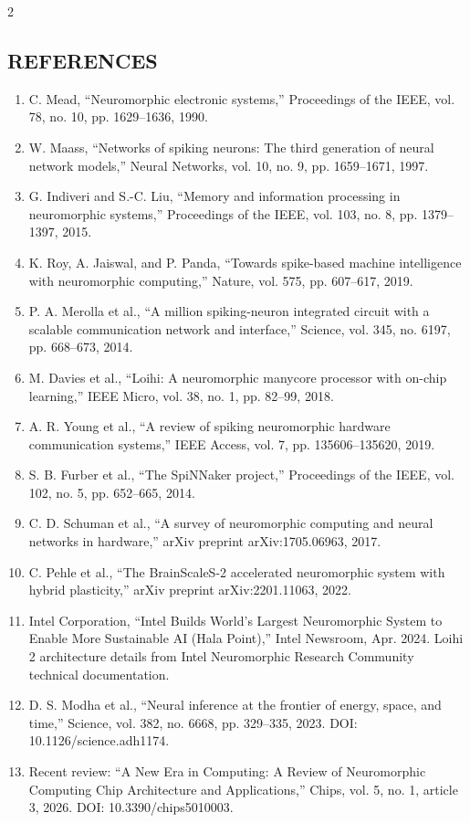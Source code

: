 \begin{multicols}{2}
  \subsection*{\centering\uppercase{References}}

  \begingroup
  \footnotesize
  \setlength{\itemsep}{0pt}
  \begin{enumerate}
    \item C. Mead, “Neuromorphic electronic systems,” Proceedings of the IEEE, vol. 78, no. 10, pp. 1629–1636, 1990.
    \item W. Maass, “Networks of spiking neurons: The third generation of neural network models,” Neural Networks, vol. 10, no. 9, pp. 1659–1671, 1997.
    \item G. Indiveri and S.-C. Liu, “Memory and information processing in neuromorphic systems,” Proceedings of the IEEE, vol. 103, no. 8, pp. 1379–1397, 2015.
    \item K. Roy, A. Jaiswal, and P. Panda, “Towards spike-based machine intelligence with neuromorphic computing,” Nature, vol. 575, pp. 607–617, 2019.
    \item P. A. Merolla et al., “A million spiking-neuron integrated circuit with a scalable communication network and interface,” Science, vol. 345, no. 6197, pp. 668–673, 2014.
    \item M. Davies et al., “Loihi: A neuromorphic manycore processor with on-chip learning,” IEEE Micro, vol. 38, no. 1, pp. 82–99, 2018.
    \item A. R. Young et al., “A review of spiking neuromorphic hardware communication systems,” IEEE Access, vol. 7, pp. 135606–135620, 2019.
    \item S. B. Furber et al., “The SpiNNaker project,” Proceedings of the IEEE, vol. 102, no. 5, pp. 652–665, 2014.
    \item C. D. Schuman et al., “A survey of neuromorphic computing and neural networks in hardware,” arXiv preprint arXiv:1705.06963, 2017.
    \item C. Pehle et al., “The BrainScaleS-2 accelerated neuromorphic system with hybrid plasticity,” arXiv preprint arXiv:2201.11063, 2022.
    \item Intel Corporation, “Intel Builds World’s Largest Neuromorphic System to Enable More Sustainable AI (Hala Point),” Intel Newsroom, Apr. 2024. Loihi 2 architecture details from Intel Neuromorphic Research Community technical documentation.
    \item D. S. Modha et al., “Neural inference at the frontier of energy, space, and time,” Science, vol. 382, no. 6668, pp. 329–335, 2023. DOI: 10.1126/science.adh1174.
    \item Recent review: “A New Era in Computing: A Review of Neuromorphic Computing Chip Architecture and Applications,” Chips, vol. 5, no. 1, article 3, 2026. DOI: 10.3390/chips5010003.
  \end{enumerate}
  \endgroup
\end{multicols}
